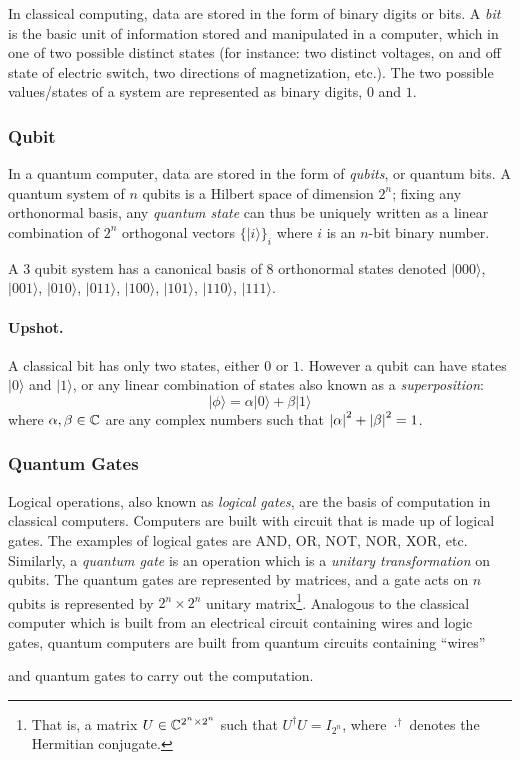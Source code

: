 \documentclass[11pt]{article}
\newcommand{\ket}[1]{|#1\rangle}
\newcommand{\adjoint}[1]{{#1}^{\dagger}} 			%
\begin{document}
In classical computing, data are stored in the form of binary digits or bits. A \emph{bit} is the basic unit of information stored and manipulated in a computer, which in one of two possible distinct states (for instance: two distinct voltages, on and off state of electric switch, two directions of magnetization, etc.). 
The two possible values/states of a system are represented as binary digits, $0$ and $1$.

\subsubsection{Qubit}
In a quantum computer, data are stored in the form of \emph{qubits}, or quantum bits. A quantum system of $n$ qubits is a Hilbert space of dimension $2^n$; fixing any orthonormal basis, any \emph{quantum state} can thus be uniquely written as a linear combination of $2^n$ orthogonal vectors $\{\ket{i}\}_i$ where $i$ is an $n$-bit binary number.

\begin{example}A $3$ qubit system has a canonical basis of 8 orthonormal states denoted 
$\ket{000}$, $\ket{001}$, $\ket{010}$, $\ket{011}$, $\ket{100}$, $\ket{101}$, $\ket{110}$, $\ket{111}$.
\end{example}
\paragraph{Upshot.} A classical bit has only two states, either $0$ or $1$. However a qubit can have  states $\ket{0}$ and $\ket{1}$, or any linear combination of states also known as a \emph{superposition}: %
\[
	\ket{\phi}=\alpha\ket{0}+\beta\ket{1}
\]
where $\alpha,\beta\in\mathbb{C}$ are any complex numbers such that $\left\lvert \alpha \right\rvert^2+\left\lvert \beta \right\rvert^2=1$.

\subsubsection{Quantum Gates}
Logical operations, also known as \emph{logical gates}, are the basis of computation in classical computers. Computers are built with circuit that is made up of logical gates. The examples of logical gates are \textsf{AND}, \textsf{OR}, \textsf{NOT}, \textsf{NOR}, \textsf{XOR}, etc. Similarly,  a \emph{quantum gate} is an operation which is a \emph{unitary transformation} on qubits. The quantum gates are represented by matrices, and a gate acts on $n$ qubits is represented by $2^n \times 2^n$ unitary matrix\footnote{That is, a matrix $U\in\mathbb{C}^{2^n\times 2^n}$ such that $\adjoint{U}U=I_{2^n}$, where $\adjoint{\cdot}$ denotes the Hermitian conjugate.}. Analogous to the classical computer which is built from an electrical circuit containing wires and logic gates, quantum computers are built from  quantum circuits containing ``wires''  and quantum gates to carry out the computation.\medskip
\end{document}

